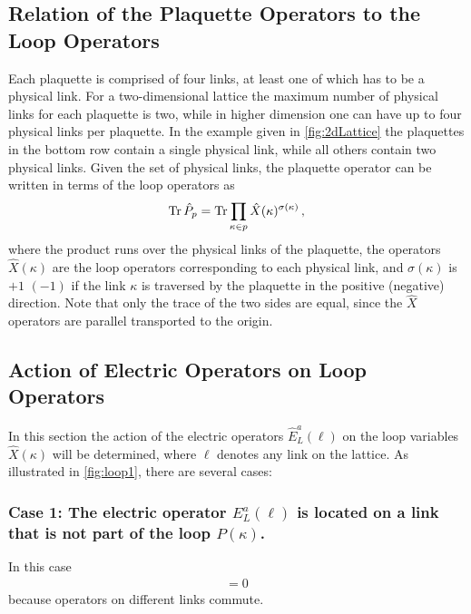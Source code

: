 \documentclass[reprint,superscriptaddress,pra,nofootinbib,preprintnumbers,floatfix]{revtex4-1}
\begin{document}
\subsection{Relation of the Plaquette Operators to the Loop Operators}

Each plaquette is comprised of four links, at least one of which has to be a physical link. 
%
For a two-dimensional lattice the maximum number of physical links for each plaquette is two, while in higher dimension one can have up to four physical links per plaquette. 
%
In the example given in \cref{fig:2dLattice} the plaquettes in the bottom row contain a single physical link, while all others contain two physical links. 
%
Given the set of physical links, the plaquette operator can be written in terms of the loop operators as
\begin{align}
\label{eq:P_through_X}
    \Tr \hat P_p = \Tr \prod_{\kappa\in p} \hat X(\kappa)^{\sigma(\kappa)}
    \,,
\end{align}
where the product runs over the physical links of the plaquette, the operators $\hat X(\kappa)$ are the loop operators corresponding to each physical link, and $\sigma(\kappa)$ is $+1$ $(-1)$ if the link $\kappa$ is traversed by the plaquette in the positive (negative) direction. 
%
Note that only the trace of the two sides are equal, since the $\hat X$ operators are parallel transported to the origin.

\subsection{Action of Electric Operators on Loop Operators}

In this section the action of the electric operators $\hat E_{L}^a({\ell})$ on the loop variables $\hat X(\kappa)$ will be determined, where $\ell$ denotes any link on the lattice.
%
As illustrated in \cref{fig:loop1}, there are several cases:
%

\subsubsection*{Case 1: The electric operator \texorpdfstring{$E_L^a(\ell)$}{Ea(l)} is located on a link that is not part of the loop \texorpdfstring{$P(\kappa)$}{P(kappa)}. }
In this case 
\begin{align}
    [\hat E_L^a(\ell), \hat X(\kappa)] = 0
\end{align}
because operators on different links commute.
\end{document}
